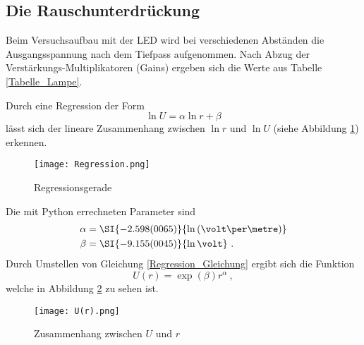 \subsection{Die Rauschunterdrückung}
Beim Versuchsaufbau mit der LED wird bei verschiedenen Abständen die Ausgangsspannung nach dem Tiefpass aufgenommen. Nach Abzug der Verstärkungs-Multiplikatoren (Gains) ergeben sich die Werte aus Tabelle \ref{Tabelle_Lampe}.

Durch eine Regression der Form
\begin{equation}\label{Regression_Gleichung}
	\ln U = \alpha\ln r +\beta
\end{equation}
lässt sich der lineare Zusammenhang zwischen $\ln r$ und $\ln U$ (siehe Abbildung \ref{Regression}) erkennen.
\begin{figure}[h!]
	\texttt{[image: Regression.png]}
	\caption{Regressionsgerade}
	\label{Regression}
\end{figure}
Die mit Python errechneten Parameter sind
\begin{align}
	\alpha &= \SI{-2.598(0065)}{\ln\left(\volt\per\metre\right)} \\
	\beta &= \SI{-9.155(0045)}{\ln\volt}\ .
\end{align}
Durch Umstellen von Gleichung \eqref{Regression_Gleichung} ergibt sich die Funktion
\begin{equation}
	U(r) = \exp(\beta) r^\alpha\ ,
\end{equation}
welche in Abbildung \ref{U(r)} zu sehen ist.
\begin{figure}[h!]
	\texttt{[image: U(r).png]}
	\caption{Zusammenhang zwischen $U$ und $r$}
	\label{U(r)}
\end{figure}
